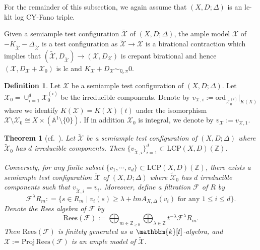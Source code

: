 \documentclass[reqno, 12pt]{amsart}
\newtheorem{thm}[prop]{Theorem}
\theoremstyle{definition}
\newtheorem{defn}[prop]{Definition}
\newcommand{\bA}{\mathbb{A}}
\newcommand{\bQ}{\mathbb{Q}}
\newcommand{\bZ}{\mathbb{Z}}
\newcommand{\bk}{\mathbbm{k}}
\newcommand{\cX}{\mathcal{X}}
\newcommand{\cF}{\mathcal{F}}
\newcommand{\ord}{\mathrm{ord}}
\newcommand{\tcX}{\widetilde{\mathcal{X}}}
\newcommand{\Proj}{\mathrm{Proj}}
\newcommand{\LCP}{\mathrm{LCP}}
\newcommand{\Rees}{\mathrm{Rees}}
\numberwithin{equation}{section}
\begin{document}
For the remainder of this subsection, we again assume that  $(X,D;\Delta)$ is an lc-klt log CY-Fano triple.

 Given a semiample test configuration $\tcX$ of $(X,D;\Delta)$, the ample model $\cX$ of $-K_{\tcX}-\Delta_{\tcX}$ is a test configuration as $\tcX\to \cX$ is a birational contraction which implies that $(\tcX, D_{\tcX})\to (\cX, D_{\cX})$ is crepant birational and hence $(\cX,D_{\cX}+ \cX_0)$ is lc and $K_{\cX}+ D_{\cX} \sim_{\bQ,\pi} 0$.

\begin{defn}
Let $\cX$ be a semiample test configuration of $(X,D;\Delta)$. Let $\cX_0=\cup_{i=1}^{d} \cX_0^{(i)}$ be the irreducible components. Denote by $v_{\cX,i}:=\ord_{\cX_0^{(i)}}|_{K(X)}$ where we identify $K(\cX) = K(X)(t)$ under the isomorphism $\cX\setminus \cX_0 \cong X\times (\bA^1\setminus\{0\})$. If in addition $\cX_0$ is integral, we denote by $v_{\cX}:= v_{\cX,1}$.
\end{defn}


\begin{thm}[cf.\ \cite{BLX22, BABWILD}]\label{thm:sa-tc}
Let $\tcX$ be a semiample test configuration of $(X,D;\Delta)$ where $\tcX_0$ has $d$ irreducible components. Then $\{v_{\tcX,i}\}_{i=1}^{d}\subset \LCP(X,D)(\bZ)$. 

Conversely, for any finite subset $\{v_1, \cdots, v_d\}\subset \LCP(X,D)(\bZ)$, there exists a semiample test configuration $\tcX$ of $(X,D;\Delta)$ where $\tcX_0$ has $d$ irreducible components such that $v_{\tcX,i} = v_{i}$.
Moreover, define  a filtration $\cF$ of $R$ by
\[
\cF^{\lambda} R_m : = \{s\in R_m \mid  v_{i}(s) \geq \lambda + lm A_{X,\Delta}(v_{i})\textrm{ for any }1\leq i \leq d\}.
\]
Denote the Rees algebra of $\cF$ by 
\[
\Rees(\cF):= \bigoplus_{m\in \bZ_{\geq 0}}\bigoplus_{\lambda\in \bZ} t^{-\lambda}\cF^\lambda R_m.
\]
Then $\Rees(\cF)$ is finitely generated as a $\bk[t]$-algebra, and $\cX:=\Proj \,\Rees(\cF)$ is an ample model of $\tcX$. 
\end{thm}
\end{document}
